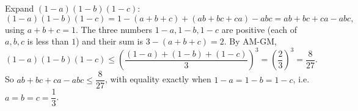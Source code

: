 Expand $(1-a)(1-b)(1-c)$:
\[
(1-a)(1-b)(1-c)=1-(a+b+c)+(ab+bc+ca)-abc=ab+bc+ca-abc,
\]
using $a+b+c=1$. The three numbers $1-a,1-b,1-c$ are positive (each of $a,b,c$ is less than $1$) and their sum is $3-(a+b+c)=2$. By AM-GM,
\[
(1-a)(1-b)(1-c)\le\left(\dfrac{(1-a)+(1-b)+(1-c)}{3}\right)^3=\left(\dfrac{2}{3}\right)^3=\dfrac{8}{27}.
\]
So $ab+bc+ca-abc\le\dfrac{8}{27}$, with equality exactly when $1-a=1-b=1-c$, i.e. $\boxed{a=b=c=\dfrac{1}{3}}$.
